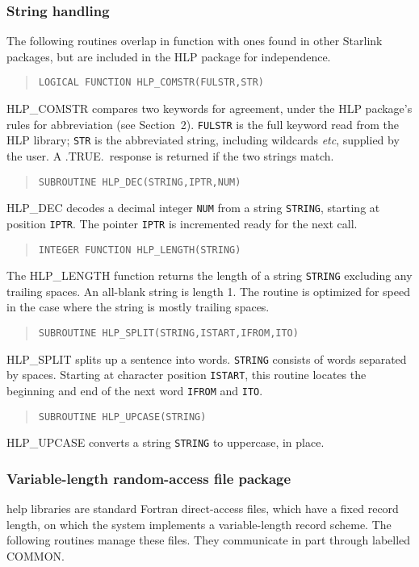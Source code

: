 \subsubsection{String handling}
The following routines overlap in function with ones found
in other Starlink packages, but are included in the HLP package for
independence.

\begin{verse}
{\tt LOGICAL FUNCTION HLP\_COMSTR(FULSTR,STR)}
\end{verse}
HLP\_COMSTR compares two keywords for agreement, under the HLP
package's rules for abbreviation (see Section~2).  {\tt FULSTR}
is the full keyword read from the HLP library; {\tt STR} is
the abbreviated string, including wildcards {\it etc}, supplied
by the user.  A .TRUE.\, response is returned if the
two strings match.

\begin{verse}
{\tt SUBROUTINE HLP\_DEC(STRING,IPTR,NUM)}
\end{verse}
HLP\_DEC decodes a decimal integer {\tt NUM}
from a string {\tt STRING}, starting at position {\tt IPTR}.
The pointer {\tt IPTR} is incremented ready for the next call.

\begin{verse}
{\tt INTEGER FUNCTION HLP\_LENGTH(STRING)}
\end{verse}
The HLP\_LENGTH function returns the
length of a string {\tt STRING} excluding any
trailing spaces.  An all-blank string is length 1.  The routine is
optimized for speed in the case where the string is mostly trailing
spaces.

\begin{verse}
{\tt SUBROUTINE HLP\_SPLIT(STRING,ISTART,IFROM,ITO)}
\end{verse}
HLP\_SPLIT splits up a sentence into words.
{\tt STRING} consists of words separated by spaces.  Starting
at character position {\tt ISTART}, this routine locates the
beginning and end of the next word {\tt IFROM} and {\tt ITO}.

\begin{verse}
{\tt SUBROUTINE HLP\_UPCASE(STRING)}
\end{verse}
HLP\_UPCASE converts a string {\tt STRING} to uppercase, in place.

\subsubsection{Variable-length random-access file package}
help libraries are standard Fortran direct-access files, which have
a fixed record length, on which the system implements a
variable-length record scheme.  The following routines manage
these files.  They communicate in part through labelled
COMMON.

